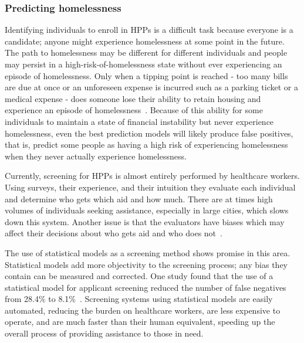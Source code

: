 \documentclass[10pt,letterpaper]{article}
\begin{document}
\subsubsection*{Predicting homelessness}
Identifying individuals to enroll in HPPs is a difficult task because everyone is a candidate; anyone might experience homelessness at some point in the future. The path to homelessness may be different for different individuals and people may persist in a high-risk-of-homelessness state without ever experiencing an episode of homelessness. Only when a tipping point is reached - too many bills are due at once or an unforeseen expense is incurred such as a parking ticket or a medical expense - does someone lose their ability to retain housing and experience an episode of homelessness~\cite{o2004wrong}. Because of this ability for some individuals to maintain a state of financial instability but never experience homelessness, even the best prediction models will likely produce false positives, that is, predict some people as having a high risk of experiencing homelessness when they never actually experience homelessness.

Currently, screening for HPPs is almost entirely performed by healthcare workers. Using surveys, their experience, and their intuition they evaluate each individual and determine who gets which aid and how much. There are at times high volumes of individuals seeking assistance, especially in large cities, which slows down this system. Another issue is that the evaluators have biases which may affect their decisions about who gets aid and who does not~\cite{shinn2019homelessness}.

The use of statistical models as a screening method shows promise in this area. Statistical models add more objectivity to the screening process; any bias they contain can be measured and corrected. One study found that the use of a statistical model for applicant screening reduced the number of false negatives from 28.4\% to 8.1\%~\cite{shinn2019homelessness}. Screening systems using statistical models are easily automated, reducing the burden on healthcare workers, are less expensive to operate, and are much faster than their human equivalent, speeding up the overall process of providing assistance to those in need.
\end{document}
